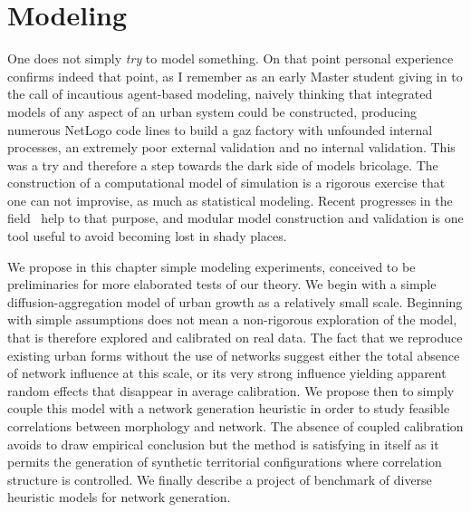 


\chapter{Modeling} %

\label{ch:modeling} %








\bigskip


One does not simply \emph{try} to model something. On that point personal experience confirms indeed that point, as I remember as an early Master student giving in to the call of incautious agent-based modeling, naively thinking that integrated models of any aspect of an urban system could be constructed, producing numerous NetLogo code lines to build a gaz factory with unfounded internal processes, an extremely poor external validation and no internal validation. This was a try and therefore a step towards the dark side of models bricolage. The construction of a computational model of simulation is a rigorous exercise that one can not improvise, as much as statistical modeling. Recent progresses in the field~\cite{banos2013pour} help to that purpose, and modular model construction and validation is one tool useful to avoid becoming lost in shady places.

We propose in this chapter simple modeling experiments, conceived to be preliminaries for more elaborated tests of our theory. We begin with a simple diffusion-aggregation model of urban growth as a relatively small scale. Beginning with simple assumptions does not mean a non-rigorous exploration of the model, that is therefore explored and calibrated on real data. The fact that we reproduce existing urban forms without the use of networks suggest either the total absence of network influence at this scale, or its very strong influence yielding apparent random effects that disappear in average calibration. We propose then to simply couple this model with a network generation heuristic in order to study feasible correlations between morphology and network. The absence of coupled calibration avoids to draw empirical conclusion but the method is satisfying in itself as it permits the generation of synthetic territorial configurations where correlation structure is controlled. We finally describe a project of benchmark of diverse heuristic models for network generation.





